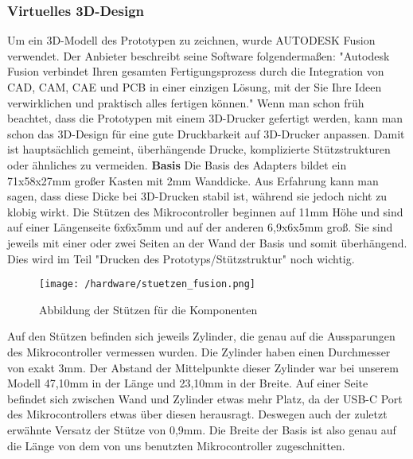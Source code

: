 \documentclass[]{article}
\begin{document}
\subsubsection{Virtuelles 3D-Design}
Um ein 3D-Modell des Prototypen zu zeichnen, wurde AUTODESK Fusion verwendet. Der Anbieter beschreibt seine Software folgendermaßen: "Autodesk Fusion verbindet Ihren gesamten Fertigungsprozess durch die Integration von CAD, CAM, CAE und PCB in einer einzigen Lösung, mit der Sie Ihre Ideen verwirklichen und praktisch alles fertigen können."\newline
Wenn man schon früh beachtet, dass die Prototypen mit einem 3D-Drucker gefertigt werden, kann man schon das 3D-Design für eine gute Druckbarkeit auf 3D-Drucker anpassen. Damit ist hauptsächlich gemeint, überhängende Drucke, komplizierte Stützstrukturen oder ähnliches zu vermeiden.
\vspace{4mm}\newline
\textbf{Basis} \newline
Die Basis des Adapters bildet ein 71x58x27mm großer Kasten mit 2mm Wanddicke. Aus Erfahrung kann man sagen, dass diese Dicke bei 3D-Drucken stabil ist, während sie jedoch nicht zu klobig wirkt.\newline
Die Stützen des Mikrocontroller beginnen auf 11mm Höhe und sind auf einer Längenseite 6x6x5mm und auf der anderen 6,9x6x5mm groß. Sie sind jeweils mit einer oder zwei Seiten an der Wand der Basis und somit überhängend. Dies wird im Teil "Drucken des Prototyps/Stützstruktur" noch wichtig.\newline
\begin{figure}[H]
\begin{flushleft}
\texttt{[image: /hardware/stuetzen\_fusion.png]}
\caption{Abbildung der Stützen für die Komponenten}
\end{flushleft}
\end{figure}
Auf den Stützen befinden sich jeweils Zylinder, die genau auf die Aussparungen des Mikrocontroller vermessen wurden. Die Zylinder haben einen Durchmesser von exakt 3mm. Der Abstand der Mittelpunkte dieser Zylinder war bei unserem Modell 47,10mm in der Länge und 23,10mm in der Breite. Auf einer Seite befindet sich zwischen Wand und Zylinder etwas mehr Platz, da der USB-C Port des Mikrocontrollers etwas über diesen herausragt. Deswegen auch der zuletzt erwähnte Versatz der Stütze von 0,9mm.\newline
Die Breite der Basis ist also genau auf die Länge von dem von uns benutzten Mikrocontroller zugeschnitten.\newline
\end{document}
